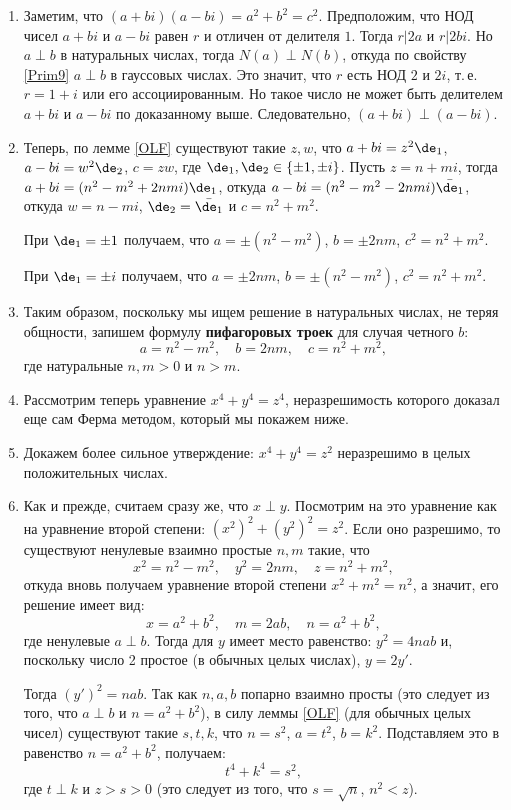 \begin{enumerate}
\item Заметим, что $(a+bi)(a-bi)=a^2+b^2=c^2$. Предположим, что НОД чисел $a+bi$ и $a-bi$ равен $r$ и отличен от делителя $1$. Тогда $r|2a$ и $r|2bi$. Но $a\perp b$ в натуральных числах, тогда $N(a)\perp N(b)$, откуда по свойству \ref{Prim9} $a\perp b$ в гауссовых числах. Это значит, что $r$ есть НОД $2$ и $2i$, т.\,е. $r=1+i$ или его ассоциированным. Но такое число не может быть делителем $a+bi$ и $a-bi$ по доказанному выше. Следовательно, $(a+bi)\perp (a-bi)$.

\item Теперь, по лемме \ref{OLF} существуют такие $z,w$, что $a+bi=z^2\de_1$, $a-bi=w^2\de_2$, $c=zw$, где $\de_1,\de_2\in\{\pm 1,\pm i\}$. Пусть $z=n+mi$, тогда $a+bi=(n^2-m^2+2nmi)\de_1$, откуда $a-bi=(n^2-m^2-2nmi)\bar{\de_1}$, откуда $w=n-mi$, $\de_2=\bar{\de_1}$ и $c=n^2+m^2$.

При $\de_1=\pm 1$ получаем, что $a=\pm(n^2-m^2)$, $b=\pm 2nm$, $c^2=n^2+m^2$.

При $\de_1=\pm i$ получаем, что $a=\pm 2nm$, $b=\pm(n^2-m^2)$, $c^2=n^2+m^2$.

\item Таким образом, поскольку мы ищем решение в натуральных числах, не теряя общности, запишем формулу \textbf{пифагоровых троек} для случая четного $b$:
$$
a=n^2-m^2,\quad b=2nm,\quad c=n^2+m^2,
$$
где натуральные $n,m>0$ и $n>m$. 

\item Рассмотрим теперь уравнение $x^4+y^4=z^4$, неразрешимость которого доказал еще сам Ферма методом, который мы покажем ниже. 

\item Докажем более сильное утверждение: $x^4+y^4=z^2$ неразрешимо в целых положительных числах.
\item Как и прежде, считаем сразу же, что $x\perp y$. Посмотрим на это уравнение как на уравнение второй степени: $(x^2)^2+(y^2)^2=z^2$. Если оно разрешимо, то существуют ненулевые взаимно простые $n,m$ такие, что
$$
x^2=n^2-m^2,\quad y^2=2nm,\quad z=n^2+m^2,
$$
откуда вновь получаем уравнение второй степени $x^2+m^2=n^2$, а значит, его решение имеет вид:
$$
x=a^2+b^2,\quad m=2ab,\quad n=a^2+b^2,
$$
где ненулевые $a\perp b$. Тогда для $y$ имеет место равенство: $y^2=4nab$ и, поскольку число 2 простое (в обычных целых числах), $y=2y'$.

Тогда $(y')^2=nab$. Так как $n,a,b$ попарно взаимно просты (это следует из того, что $a\perp b$ и $n=a^2+b^2$), в силу леммы \ref{OLF} (для обычных целых чисел) существуют такие $s,t,k$, что $n=s^2$, $a=t^2$, $b=k^2$. Подставляем это в равенство $n=a^2+b^2$, получаем:
$$
t^4+k^4=s^2,
$$
где $t\perp k$ и $z>s>0$ (это следует из того, что $s=\sqrt n$, $n^2<z$). 


\end{enumerate}
